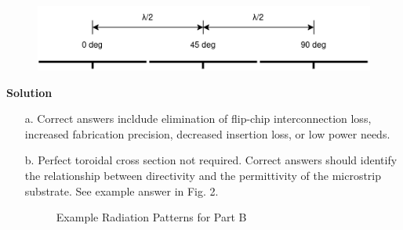 \documentclass[12pt]{article}
\begin{document}
\begin{enumerate}
\begin{enumerate}
        \begin{figure}[!ht]
            \centering
            \includegraphics[width=5in]{feed.png}
        \end{figure}
    \end{enumerate}
    
    \newpage

    \textbf{Solution}

    \begin{enumerate}
        \item[a.] Correct answers incldude elimination of flip-chip interconnection loss, increased fabrication precision, decreased insertion loss, or 
        low power needs. 

        
        \item[b.] Perfect toroidal cross section not required. Correct answers should identify the relationship
        between directivity and the permittivity of the microstrip substrate. See example answer in Fig. 2.

        \begin{figure}[!ht]
            \centering
            \caption{Example Radiation Patterns for Part B}
        \end{figure}


\end{enumerate}
\end{enumerate}
\end{document}
